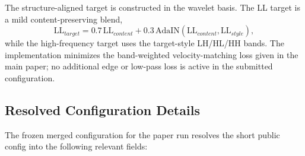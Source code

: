 \documentclass[10pt,twocolumn]{article}
\begin{document}
The structure-aligned target is constructed in the wavelet basis. The LL target is a mild
content-preserving blend,
\[
  \mathrm{LL}_{target} = 0.7\,\mathrm{LL}_{content}
  + 0.3\,\mathrm{AdaIN}(\mathrm{LL}_{content}, \mathrm{LL}_{style}),
\]
while the high-frequency target uses the target-style LH/HL/HH bands. The implementation
minimizes the band-weighted velocity-matching loss given in the main paper; no additional edge
or low-pass loss is active in the submitted configuration.

\subsection{Resolved Configuration Details}

The frozen merged configuration for the paper run resolves the short public config
into the following relevant fields:
\end{document}
